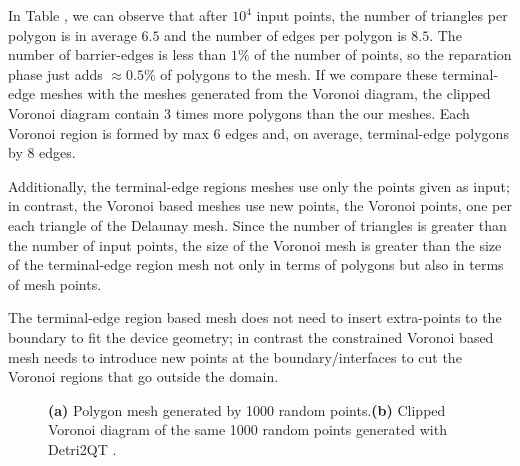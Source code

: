 \documentclass[pdflatex,sn-mathphys]{sn-jnl}%
\theoremstyle{thmstyleone}%
\theoremstyle{thmstyletwo}%
\theoremstyle{thmstylethree}%
\begin{document}
In Table \label{table:results}, we can observe that after $10^4$ input points, the number of triangles per polygon is in average $6.5$ and the number of edges per polygon is $8.5$. The number of barrier-edges is less than $1\%$ of the number of points, so the reparation phase just adds $\approx 0.5\%$ of polygons to the mesh. If we compare these terminal-edge meshes with the meshes generated from the Voronoi diagram, the clipped Voronoi diagram contain 3 times more polygons than the our meshes. Each Voronoi region is formed by max 6 edges and, on average, terminal-edge polygons by 8 edges. 

Additionally, the terminal-edge regions meshes use only the points given as input; in contrast, the Voronoi based meshes use new points, the Voronoi points, one per each triangle of the Delaunay mesh. Since the number of triangles is greater than the number of input points, the size of the Voronoi mesh is greater than the size of the terminal-edge region mesh not only in terms of polygons but also in terms of mesh points.%

The terminal-edge region based mesh does not need to insert extra-points to the boundary to fit the device geometry; in contrast the constrained  Voronoi based mesh needs to introduce new points at the boundary/interfaces to cut the Voronoi regions that go outside the domain.  


\begin{figure}[!h]
\centering     %
{} \hspace{0.5cm}
\caption{\textbf{(a)} Polygon mesh generated by 1000 random points.\textbf{(b)} Clipped Voronoi diagram of the same 1000 random points generated with Detri2QT \cite{Detri2}. }
\label{figs:voro_comp} 
\end{figure}
\end{document}
